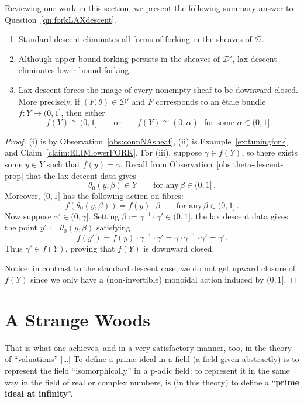 \documentclass[a4paper, 11pt,reqno]{amsart}
\newcommand{\D}{\mathcal{D}}
\begin{document}
Reviewing our work in this section, we present the following summary answer to Question~\ref{qn:forkLAXdescent}.

\begin{conclusion}\label{conc:forking}\hfill 
	\begin{enumerate}[label=(\roman*)]
		\item Standard descent eliminates all forms of forking in the sheaves of $\D$. 
		\item Although upper bound forking persists in the sheaves of $\D'$, lax descent eliminates lower bound forking. 
		\item Lax descent forces the image of every nonempty sheaf to be downward closed. More precisely, if $(F,\theta)\in\D'$ and $F$ corresponds to an \'{e}tale bundle $f\colon Y\rightarrow (0,1]$, then either $$f(Y)\cong (0,1] \qquad\text{or}\qquad f(Y)\cong (0,\alpha) \,\,\,\,\text{for some}\,\, \alpha\in (0,1].$$
	\end{enumerate}
\end{conclusion}
\begin{proof} (i) is by Observation~\ref{obs:connNAsheaf}, (ii) is Example~\ref{ex:tuningfork} and Claim~\ref{claim:ELIMlowerFORK}. For (iii), suppose $\gamma\in f(Y)$, so there exists some $y\in Y$ such that $f(y)=\gamma$. Recall from Observation~\ref{obs:theta-descent-prop} that the lax descent data gives $$\theta_0(y,\beta)\in Y \qquad\text{for any}\, \beta\in (0,1]\,.$$ 
Moreover, $(0,1]$ has the following action on fibres:  $$f(\theta_0(y,\beta))=f(y)\cdot \beta\qquad\text{for any}\, \beta\in (0,1]\,.$$
Now suppose $\gamma'\in(0,\gamma]$. Setting $\beta:=\gamma^{-1}\cdot \gamma'\in (0,1]$, the lax descent data gives the point $y':=\theta_0(y,\beta)$ satisfying
	\[f(y')=f(y)\cdot\gamma^{-1}\cdot\gamma'=\gamma\cdot\gamma^{-1}\cdot\gamma'=\gamma'.\]
Thus $\gamma'\in f(Y)$, proving that $f(Y)$ is downward closed.

Notice: in contrast to the standard descent case, we do not get upward closure of $f(Y)$ since we only have a (non-invertible) monoidal action induced by $(0,1]$.
\end{proof}


\section{A Strange Woods}\label{sec:strangewoods}
\begin{fquote}
	That is what one achieves, and in a very satisfactory manner, too, in the theory of “valuations” [\dots]  To define a prime ideal in a field (a field given
	abstractly) is to represent the field “isomorphically” in a p-adic field: to represent it in the same
	way in the field of real or complex numbers, is (in
	this theory) to define a “\textbf{prime ideal at infinity}”.
\end{fquote}
\end{document}
